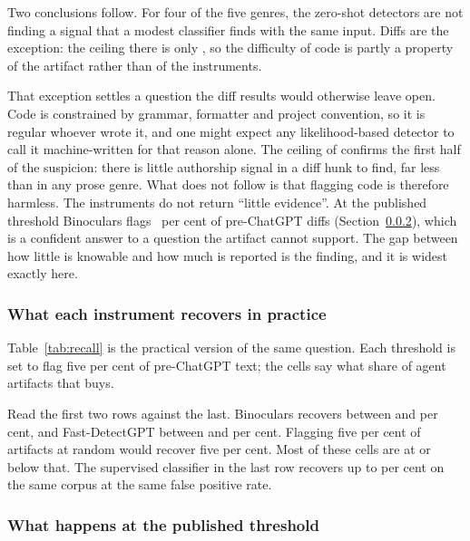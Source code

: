 Two conclusions follow. For four of the five genres, the zero-shot detectors are not
finding a signal that a modest classifier finds with the same input. Diffs are the
exception: the ceiling there is only \CeilingAurocMin{}, so the difficulty of code is
partly a property of the artifact rather than of the instruments.

That exception settles a question the diff results would otherwise leave open. Code is
constrained by grammar, formatter and project convention, so it is regular whoever wrote
it, and one might expect any likelihood-based detector to call it machine-written for
that reason alone. The ceiling of \CeilingAurocMin{} confirms the first half of the
suspicion: there is little authorship signal in a diff hunk to find, far less than in
any prose genre. What does not follow is that flagging code is therefore harmless. The
instruments do not return ``little evidence''. At the published threshold Binoculars
flags \PublishedBinoDiffFpr{}~per cent of pre-ChatGPT diffs
(Section~\ref{sec:validity:rq1:published}), which is a confident answer to a question
the artifact cannot support. The gap between how little is knowable and how much is
reported is the finding, and it is widest exactly here.

\subsubsection{What each instrument recovers in practice}
\label{sec:validity:rq1:recall}



Table~\ref{tab:recall} is the practical version of the same question. Each threshold is
set to flag five per cent of pre-ChatGPT text; the cells say what share of agent
artifacts that buys.

Read the first two rows against the last. Binoculars recovers between
 and  per cent, and Fast-DetectGPT between  and
 per cent. Flagging five per cent of artifacts at random would recover five
per cent. Most of these cells are at or below that. The supervised classifier in the last
row recovers up to \CeilingRecallMax{} per cent on the same corpus at the same false
positive rate.

\subsubsection{What happens at the published threshold}
\label{sec:validity:rq1:published}

